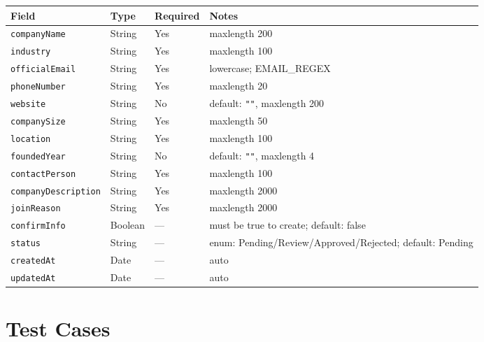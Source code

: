 \documentclass[12pt,a4paper]{article}
\begin{document}
\begin{longtable}{p{3.8cm}p{2.5cm}p{1.8cm}p{5.2cm}}
  \toprule
  \textbf{Field} & \textbf{Type} & \textbf{Required} & \textbf{Notes} \\
  \midrule
  \texttt{companyName}       & String  & Yes & maxlength 200 \\
  \texttt{industry}          & String  & Yes & maxlength 100 \\
  \texttt{officialEmail}     & String  & Yes & lowercase; EMAIL\_REGEX \\
  \texttt{phoneNumber}       & String  & Yes & maxlength 20 \\
  \texttt{website}           & String  & No  & default: \texttt{""}, maxlength 200 \\
  \texttt{companySize}       & String  & Yes & maxlength 50 \\
  \texttt{location}          & String  & Yes & maxlength 100 \\
  \texttt{foundedYear}       & String  & No  & default: \texttt{""}, maxlength 4 \\
  \texttt{contactPerson}     & String  & Yes & maxlength 100 \\
  \texttt{companyDescription}& String  & Yes & maxlength 2000 \\
  \texttt{joinReason}        & String  & Yes & maxlength 2000 \\
  \texttt{confirmInfo}       & Boolean & — & must be true to create; default: false \\
  \texttt{status}            & String  & — & enum: Pending/Review/Approved/Rejected; default: Pending \\
  \texttt{createdAt}         & Date    & — & auto \\
  \texttt{updatedAt}         & Date    & — & auto \\
  \bottomrule
\end{longtable}

\newpage

\section{Test Cases}

\setlength{\tabcolsep}{4pt}
\end{document}
